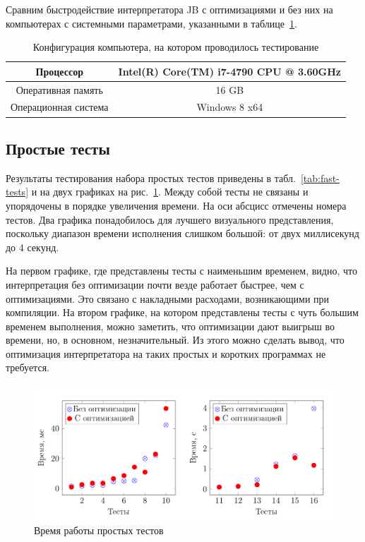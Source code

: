 	Сравним быстродействие интерпретатора JB с оптимизациями и без них на компьютерах с системными параметрами, указанными в таблице~\ref{tab:config}.\\



	\begin{table}[h]
		\begin{center}
			\begin{tabular}{|c|c|}
				\hline Процессор & Intel(R) Core(TM) i7-4790 CPU @ 3.60GHz  \\
				\hline Оперативная память & 16 GB \\
				\hline Операционная система & Windows 8 x64 \\
				\hline 
			\end{tabular}
		\end{center}
		\caption{\label{tab:config}Конфигурация компьютера, на котором проводилось тестирование}
	\end{table}
	\subsection*{Простые тесты}
	Результаты тестирования набора простых тестов приведены в табл.~\ref{tab:fast-tests} и на двух графиках на рис.~\ref{graphic: fast}. Между собой тесты не связаны и упорядочены в порядке увеличения времени. На оси абсцисс отмечены номера тестов. Два графика понадобилось для лучшего визуального представления, поскольку диапазон времени исполнения слишком большой: от двух миллисекунд до 4 секунд.
	
	На первом графике, где представлены тесты с наименьшим временем, видно, что интерпретация без оптимизации почти везде работает быстрее, чем с оптимизациями. Это связано с накладными расходами, возникающими при компиляции. На втором графике, на котором представлены тесты с чуть большим временем выполнения, можно заметить, что оптимизации дают выигрыш во времени, но, в основном, незначительный. Из этого можно сделать вывод, что оптимизация интерпретатора на таких простых и коротких программах не требуется.\\
\newcommand{\comma}[0]{,}
		\begin{figure} [h]
			\includegraphics[width=\linewidth]{Pozdin/FastTests.png}
			\caption{Время работы простых тестов}\label{graphic: fast}
		\end{figure}
		\iffalse

